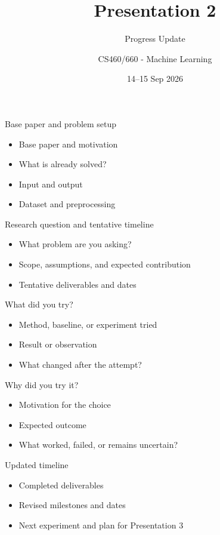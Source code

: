 \documentclass[aspectratio=169]{beamer}
\title{Presentation 2}
\subtitle{Progress Update}
\author{CS460/660 - Machine Learning}
\date{14--15 Sep 2026}
\begin{document}
\begin{frame}{Base paper and problem setup}
\begin{itemize}
  \item Base paper and motivation
  \item What is already solved?
  \item Input and output
  \item Dataset and preprocessing
\end{itemize}
\end{frame}
\begin{frame}{Research question and tentative timeline}
\begin{itemize}
  \item What problem are you asking?
  \item Scope, assumptions, and expected contribution
  \item Tentative deliverables and dates
\end{itemize}
\end{frame}
\begin{frame}{What did you try?}
\begin{itemize}
  \item Method, baseline, or experiment tried
  \item Result or observation
  \item What changed after the attempt?
\end{itemize}
\end{frame}
\begin{frame}{Why did you try it?}
\begin{itemize}
  \item Motivation for the choice
  \item Expected outcome
  \item What worked, failed, or remains uncertain?
\end{itemize}
\end{frame}
\begin{frame}{Updated timeline}
\begin{itemize}
  \item Completed deliverables
  \item Revised milestones and dates
  \item Next experiment and plan for Presentation 3
\end{itemize}
\end{frame}
\end{document}
